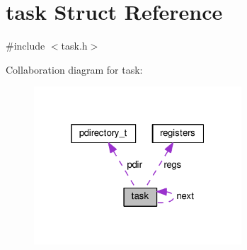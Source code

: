 \hypertarget{structtask}{}\section{task Struct Reference}
\label{structtask}


{\ttfamily \#include $<$task.\+h$>$}



Collaboration diagram for task\+:
\nopagebreak
\begin{figure}[H]
\begin{center}
\leavevmode
\includegraphics[width=220pt]{structtask__coll__graph}
\end{center}
\end{figure}
